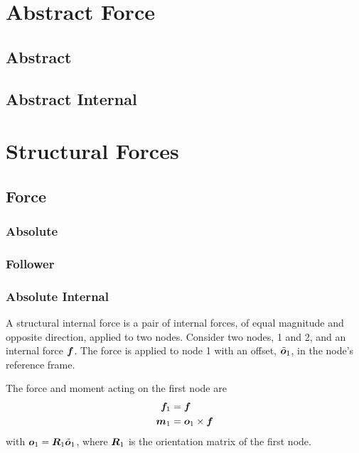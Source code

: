 \section{Abstract Force}

\subsection{Abstract}

\subsection{Abstract Internal}

\section{Structural Forces}

\subsection{Force}

\subsubsection{Absolute}

\subsubsection{Follower}

\subsubsection{Absolute Internal}
A structural internal force is a pair of internal forces, of equal magnitude and opposite direction, applied to two nodes.
Consider two nodes, 1 and 2, and an internal force $\bm{f}$.
The force is applied to node 1 with an offset, $\tilde{\bm{o}}_1$, in the node's reference frame.

The force and moment acting on the first node are
\begin{subequations}
\begin{align}
	\bm{f}_1 &= \bm{f}
	\\
	\bm{m}_1 &= \bm{o}_1 \times \bm{f}
\end{align}
\end{subequations}
with $\bm{o}_1 = \bm{R}_1 \tilde{\bm{o}}_1$, where $\bm{R}_1$ is the orientation matrix of the first node.

